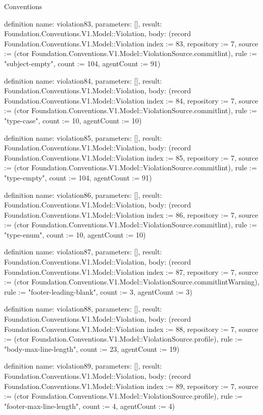\begin{lexlean}{Conventions}
\begin{semanticmodule}
definition{
  name: violation83,
  parameters: [],
  result: Foundation.Conventions.V1.Model::Violation,
  body: (record Foundation.Conventions.V1.Model::Violation {index := 83, repository := 7, source := (ctor Foundation.Conventions.V1.Model::ViolationSource.commitlint), rule := "subject-empty", count := 104, agentCount := 91})
}

definition{
  name: violation84,
  parameters: [],
  result: Foundation.Conventions.V1.Model::Violation,
  body: (record Foundation.Conventions.V1.Model::Violation {index := 84, repository := 7, source := (ctor Foundation.Conventions.V1.Model::ViolationSource.commitlint), rule := "type-case", count := 10, agentCount := 10})
}

definition{
  name: violation85,
  parameters: [],
  result: Foundation.Conventions.V1.Model::Violation,
  body: (record Foundation.Conventions.V1.Model::Violation {index := 85, repository := 7, source := (ctor Foundation.Conventions.V1.Model::ViolationSource.commitlint), rule := "type-empty", count := 104, agentCount := 91})
}

definition{
  name: violation86,
  parameters: [],
  result: Foundation.Conventions.V1.Model::Violation,
  body: (record Foundation.Conventions.V1.Model::Violation {index := 86, repository := 7, source := (ctor Foundation.Conventions.V1.Model::ViolationSource.commitlint), rule := "type-enum", count := 10, agentCount := 10})
}

definition{
  name: violation87,
  parameters: [],
  result: Foundation.Conventions.V1.Model::Violation,
  body: (record Foundation.Conventions.V1.Model::Violation {index := 87, repository := 7, source := (ctor Foundation.Conventions.V1.Model::ViolationSource.commitlintWarning), rule := "footer-leading-blank", count := 3, agentCount := 3})
}

definition{
  name: violation88,
  parameters: [],
  result: Foundation.Conventions.V1.Model::Violation,
  body: (record Foundation.Conventions.V1.Model::Violation {index := 88, repository := 7, source := (ctor Foundation.Conventions.V1.Model::ViolationSource.profile), rule := "body-max-line-length", count := 23, agentCount := 19})
}

definition{
  name: violation89,
  parameters: [],
  result: Foundation.Conventions.V1.Model::Violation,
  body: (record Foundation.Conventions.V1.Model::Violation {index := 89, repository := 7, source := (ctor Foundation.Conventions.V1.Model::ViolationSource.profile), rule := "footer-max-line-length", count := 4, agentCount := 4})
}


\end{semanticmodule}
\end{lexlean}
